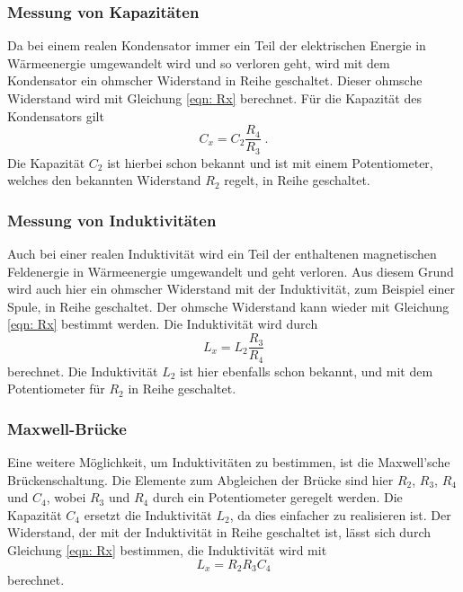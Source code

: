     \subsubsection{Messung von Kapazitäten} \label{sec:Kapazität}

        Da bei einem realen Kondensator immer ein Teil der elektrischen Energie in Wärmeenergie umgewandelt
        wird und so verloren geht, wird mit dem Kondensator ein ohmscher Widerstand in Reihe geschaltet.
        Dieser ohmsche Widerstand wird mit Gleichung \eqref{eqn: Rx} berechnet.
        Für die Kapazität des Kondensators gilt
        \begin{equation}
            C_x = C_2 \frac{R_4}{R_3} \; . \label{eqn: Cx}
        \end{equation}
        Die Kapazität $C_2$ ist hierbei schon bekannt und ist mit einem Potentiometer, welches den bekannten Widerstand $R_2$ regelt,
        in Reihe geschaltet.

    \subsubsection{Messung von Induktivitäten} \label{sec:Induktivität}

        Auch bei einer realen Induktivität wird ein Teil der enthaltenen magnetischen Feldenergie in Wärmeenergie umgewandelt
        und geht verloren. Aus diesem Grund wird auch hier ein ohmscher Widerstand mit der Induktivität, zum Beispiel einer Spule,
        in Reihe geschaltet.
        Der ohmsche Widerstand kann wieder mit Gleichung \eqref{eqn: Rx} bestimmt werden.
        Die Induktivität wird durch
        \begin{equation}
            L_x = L_2 \frac{R_3}{R_4} \label{eqn: Lx}
        \end{equation}
        berechnet.
        Die Induktivität $L_2$ ist hier ebenfalls schon bekannt, und mit dem Potentiometer für $R_2$ in Reihe geschaltet.

    \subsubsection{Maxwell-Brücke} \label{sec:Maxwell}

        Eine weitere Möglichkeit, um Induktivitäten zu bestimmen, ist die Maxwell'sche Brückenschaltung.
        Die Elemente zum Abgleichen der Brücke sind hier $R_2$, $R_3$, $R_4$ und $C_4$, wobei $R_3$ und $R_4$ durch ein
        Potentiometer geregelt werden. Die Kapazität $C_4$ ersetzt die Induktivität $L_2$, da dies
        einfacher zu realisieren ist.
        Der Widerstand, der mit der Induktivität in Reihe geschaltet ist, lässt sich durch Gleichung \eqref{eqn: Rx} bestimmen,
        die Induktivität wird mit
        \begin{equation}
            L_x = R_2 R_3 C_4 \label{sec:LxMax}
        \end{equation}
        berechnet.

